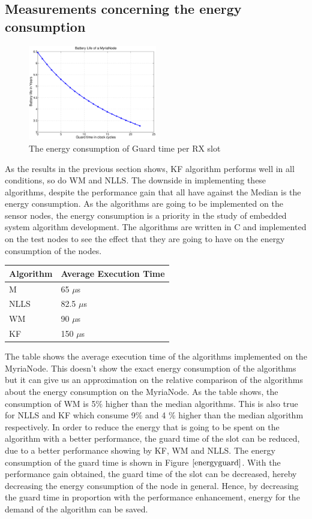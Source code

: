 \documentclass[journal]{IEEEtran}
\begin{document}
\subsection{\textbf{Measurements concerning the energy consumption}}
\begin{figure}[b]
\includegraphics[width=0.5\textwidth]{guardsave}
\caption{The energy consumption of Guard time per RX slot}
\label{energyguard}
\end{figure}
As the results in the previous section shows, KF algorithm performs
well in all conditions, so do WM and NLLS. The downside in
implementing these algorithms, despite the performance gain that all
have against the Median is the energy consumption. As the algorithms
are going to be implemented on the sensor nodes, the energy
consumption is a priority in the study of embedded system algorithm
development. The algorithms are written in C and implemented on the
test nodes to see the effect that they are going to have on the
energy consumption of the nodes.
\begin{center}
    \begin{tabular}{ |p{2cm} | p{2.75cm} |}
    \hline
    Algorithm & Average Execution Time \\ \hline
    M &  65 $\mu$s \\ \hline
    NLLS & 82.5 $\mu$s \\ \hline
    WM &   90 $\mu$s \\ \hline
    KF &  150 $\mu$s  \\ \hline
    \end{tabular}
\label{tab}
\end{center}
The table shows the average execution time of the algorithms implemented on the MyriaNode. This doesn't show the
exact energy consumption of the algorithms but it can give us an
approximation on the relative comparison of the algorithms about the
energy consumption on the MyriaNode. As the table shows, the
consumption of WM is 5$\%$ higher than the median algorithms. This
is also true for NLLS and KF which consume 9$\%$ and 4 $\%$ higher
than the median algorithm respectively. \newline
In order to reduce the energy that is going to be spent on the algorithm with
a better performance, the guard time of the slot can be reduced, due
to a better performance showing by KF, WM and NLLS. The energy
consumption of the guard time is shown in Figure $\ref{energyguard}$.
\newline
With the performance gain obtained, the guard time of the slot
can be decreased, hereby decreasing the energy consumption of the
node in general. Hence, by decreasing the guard time in proportion with the
performance enhancement, energy for the demand of
the algorithm can be saved.
\end{document}
